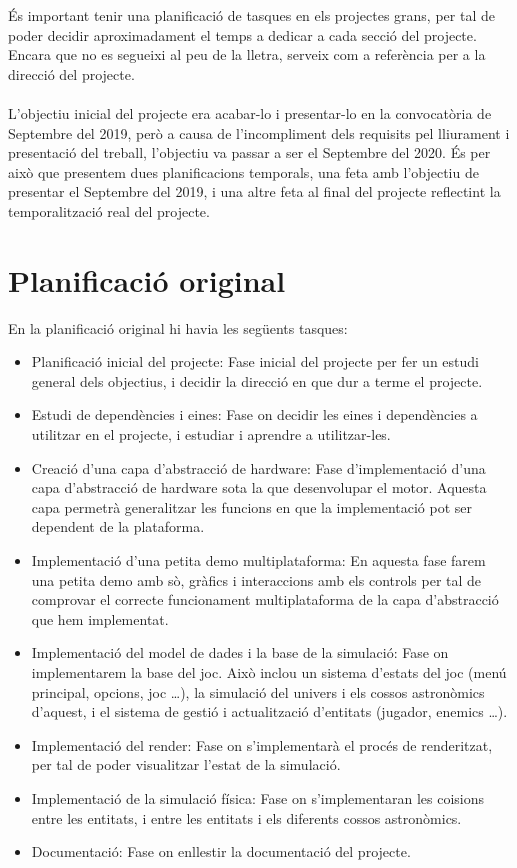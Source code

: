 És important tenir una planificació de tasques en els projectes grans, per tal de poder decidir aproximadament el temps a dedicar a cada secció del projecte.
Encara que no es segueixi al peu de la lletra, serveix com a referència per a la direcció del projecte.
\\ \\
L'objectiu inicial del projecte era acabar-lo i presentar-lo en la convocatòria de Septembre del 2019, però a causa de l'incompliment dels requisits pel lliurament i presentació del treball, l'objectiu va passar a ser el Septembre del 2020.
És per això que presentem dues planificacions temporals, una feta amb l'objectiu de presentar el Septembre del 2019, i una altre feta al final del projecte reflectint la temporalització real del projecte.

\section{Planificació original}
En la planificació original hi havia les següents tasques:
\begin{itemize}
  \item{Planificació inicial del projecte: }Fase inicial del projecte per fer un estudi general dels objectius, i decidir la direcció en que dur a terme el projecte.
  \item{Estudi de dependències i eines: }Fase on decidir les eines i dependències a utilitzar en el projecte, i estudiar i aprendre a utilitzar-les.
  \item{Creació d'una capa d'abstracció de hardware: }Fase d'implementació d'una capa d'abstracció de hardware sota la que desenvolupar el motor. Aquesta capa permetrà generalitzar les funcions en que la implementació pot ser dependent de la plataforma.
  \item{Implementació d'una petita demo multiplataforma: }En aquesta fase farem una petita demo amb sò, gràfics i interaccions amb els controls per tal de comprovar el correcte funcionament multiplataforma de la capa d'abstracció que hem implementat.
  \item{Implementació del model de dades i la base de la simulació: }Fase on implementarem la base del joc. Això inclou un sistema d'estats del joc (menú principal, opcions, joc \ldots), la simulació del univers i els cossos astronòmics d'aquest, i el sistema de gestió i actualització d'entitats (jugador, enemics \ldots).
  \item{Implementació del render: }Fase on s'implementarà el procés de renderitzat, per tal de poder visualitzar l'estat de la simulació.
  \item{Implementació de la simulació física: }Fase on s'implementaran les co\lgem isions entre les entitats, i entre les entitats i els diferents cossos astronòmics.
  \item{Documentació: }Fase on enllestir la documentació del projecte.
\end{itemize}
